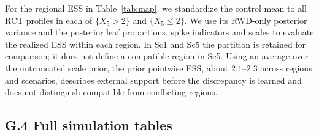 \documentclass[11pt]{article}
\theoremstyle{definition}
\theoremstyle{plain}
\begin{document}
For the regional ESS in Table~\ref{tab:map}, we standardize the control mean to all RCT profiles in each of $\{X_5>2\}$ and $\{X_5\le2\}$. We use its RWD-only posterior variance and the posterior leaf proportions, spike indicators and scales to evaluate the realized ESS within each region. In Sc1 and Sc5 the partition is retained for comparison; it does not define a compatible region in Sc5. Using an average over the untruncated scale prior, the prior pointwise ESS, about $2.1$--$2.3$ across regions and scenarios, describes external support before the discrepancy is learned and does not distinguish compatible from conflicting regions.

\subsection*{G.4 Full simulation tables}
\end{document}
